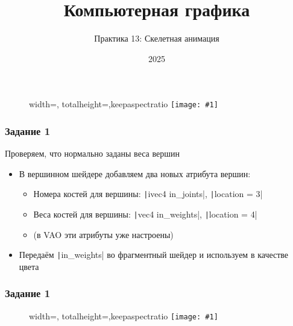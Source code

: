 \documentclass{beamer}
\title{Компьютерная графика}
\subtitle{Практика 13: Скелетная анимация}
\date{2025}
\newcommand{\slideimage}[1]{
  \begin{figure}
    \begin{adjustbox}{width=\textwidth, totalheight=\textheight-2\baselineskip-2\baselineskip,keepaspectratio}
      \texttt{[image: \#1]}
    \end{adjustbox}
  \end{figure}
}
\begin{document}
\frame{\titlepage}

\begin{frame}[fragile]
\slideimage{0.png}
\end{frame}

\begin{frame}[fragile]
\frametitle{Задание 1}
Проверяем, что нормально заданы веса вершин
\begin{itemize}
\item В вершинном шейдере добавляем два новых атрибута вершин:
\begin{itemize}
\item Номера костей для вершины: \texttt|ivec4 in_joints|, \texttt|location = 3|
\item Веса костей для вершины: \texttt|vec4 in_weights|, \texttt|location = 4|
\item (в VAO эти атрибуты уже настроены)
\end{itemize}
\item Передаём \texttt|in_weights| во фрагментный шейдер и используем в качестве цвета
\end{itemize}
\end{frame}

\begin{frame}[fragile]
\frametitle{Задание 1}
\slideimage{1.png}
\end{frame}
\end{document}
